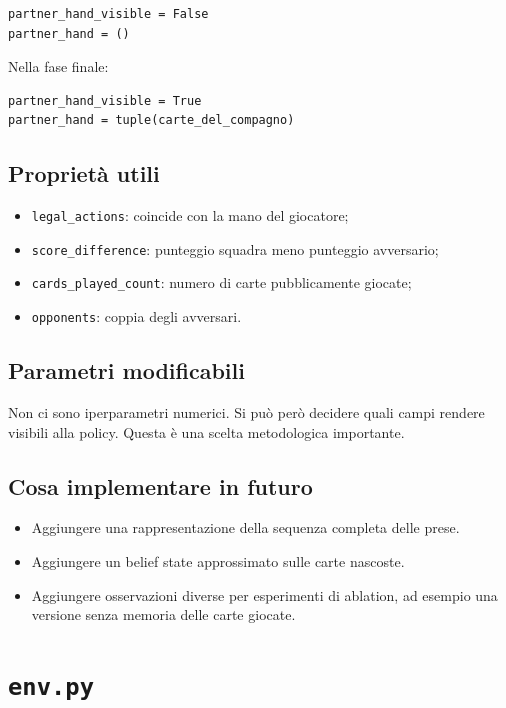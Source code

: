 \documentclass[11pt,a4paper]{article}
\begin{document}
\begin{verbatim}
partner_hand_visible = False
partner_hand = ()
\end{verbatim}

Nella fase finale:

\begin{verbatim}
partner_hand_visible = True
partner_hand = tuple(carte_del_compagno)
\end{verbatim}

\subsection{Proprietà utili}

\begin{itemize}
  \item \texttt{legal\_actions}: coincide con la mano del giocatore;
  \item \texttt{score\_difference}: punteggio squadra meno punteggio avversario;
  \item \texttt{cards\_played\_count}: numero di carte pubblicamente giocate;
  \item \texttt{opponents}: coppia degli avversari.
\end{itemize}

\subsection{Parametri modificabili}

Non ci sono iperparametri numerici. Si può però decidere quali campi rendere
visibili alla policy. Questa è una scelta metodologica importante.

\subsection{Cosa implementare in futuro}

\begin{itemize}
  \item Aggiungere una rappresentazione della sequenza completa delle prese.
  \item Aggiungere un belief state approssimato sulle carte nascoste.
  \item Aggiungere osservazioni diverse per esperimenti di ablation, ad esempio
  una versione senza memoria delle carte giocate.
\end{itemize}

\section{\texttt{env.py}}
\end{document}

